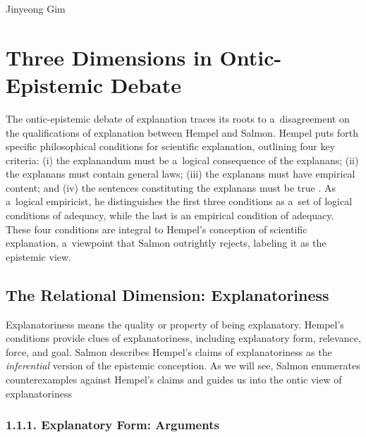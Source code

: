 \begin{artengenv}{Jinyeong Gim}
\section{Three Dimensions in Ontic-Epistemic Debate}
The ontic-epistemic debate of explanation traces its roots to a~disagreement on the qualifications of explanation between Hempel and Salmon. Hempel puts forth specific philosophical conditions for scientific explanation, outlining four key criteria: (i) the explanandum must be a~logical consequence of the explanans; (ii) the explanans must contain general laws; (iii) the explanans must have empirical content; and (iv) the sentences constituting the explanans must be true
\parencites[][pp.247–249]{hempel_aspects_1965}[][pp.137–138]{hempel_studies_1948}. %
 As a~logical empiricist, he distinguishes the first three conditions as a~set of logical conditions of adequacy, while the last is an empirical condition of adequacy. These four conditions are integral to Hempel's conception of scientific explanation, a~viewpoint that Salmon outrightly rejects, labeling it as the epistemic view.

\subsection{The Relational Dimension: Explanatoriness}

Explanatoriness means the quality or property of being explanatory. Hempel's conditions provide clues of explanatoriness, including explanatory form, relevance, force, and goal. Salmon
\parencite*[][p.84]{salmon_scientific_1984} %
 describes Hempel's claims of explanatoriness as the \textit{inferential} version of the epistemic conception. As we will see, Salmon 
\parencite*[][]{salmon_four_1989} %
 enumerates counterexamples against Hempel's claims and guides us into the ontic view of explanatoriness

\subsubsection{1.1.1. Explanatory Form: Arguments}


\end{artengenv}
